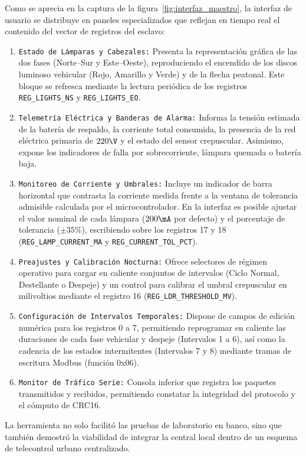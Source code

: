 Como se aprecia en la captura de la figura~\ref{fig:interfaz_maestro}, la interfaz de usuario se distribuye en paneles
especializados que reflejan en tiempo real el contenido del vector de registros del esclavo:
\begin{enumerate}
  \item \texttt{Estado de Lámparas y Cabezales:} Presenta la representación gráfica de las dos fases (Norte--Sur y
  Este--Oeste), reproduciendo el encendido de los discos luminoso vehicular (Rojo, Amarillo y Verde) y de la flecha
  peatonal. Este bloque se refresca mediante la lectura periódica de los registros \texttt{REG\_LIGHTS\_NS} y
  \texttt{REG\_LIGHTS\_EO}.
  \item \texttt{Telemetría Eléctrica y Banderas de Alarma:} Informa la tensión estimada de la batería de respaldo, la
  corriente total consumida, la presencia de la red eléctrica primaria de $220\V$ y el estado del sensor crepuscular.
  Asimismo, expone los indicadores de falla por sobrecorriente, lámpara quemada o batería baja.
  \item \texttt{Monitoreo de Corriente y Umbrales:} Incluye un indicador de barra horizontal que contrasta la corriente
  medida frente a la ventana de tolerancia admisible calculada por el microcontrolador. En la interfaz es posible
  ajustar el valor nominal de cada lámpara ($200\mA$ por defecto) y el porcentaje de tolerancia ($\pm 35\%$),
  escribiendo sobre los registros 17 y 18 (\texttt{REG\_LAMP\_CURRENT\_MA} y \texttt{REG\_CURRENT\_TOL\_PCT}).
  \item \texttt{Preajustes y Calibración Nocturna:} Ofrece selectores de régimen operativo para cargar en
  caliente conjuntos de intervalos (Ciclo Normal, Destellante o Despeje) y un control para calibrar el umbral
  crepuscular en milivoltios mediante el registro 16 (\texttt{REG\_LDR\_THRESHOLD\_MV}).
  \item \texttt{Configuración de Intervalos Temporales:} Dispone de campos de edición numérica para los registros 0 a 7,
  permitiendo reprogramar en caliente las duraciones de cada fase vehicular y despeje (Intervalos 1 a 6), así como la
  cadencia de los estados intermitentes (Intervalos 7 y 8) mediante tramas de escritura Modbus (función 0x06).
  \item \texttt{Monitor de Tráfico Serie:} Consola inferior que registra los paquetes transmitidos y recibidos,
  permitiendo constatar la integridad del protocolo y el cómputo de CRC16.
\end{enumerate}

La herramienta no solo facilitó las pruebas de laboratorio en banco, sino que también demostró la viabilidad de
integrar la central local dentro de un esquema de telecontrol urbano centralizado.
